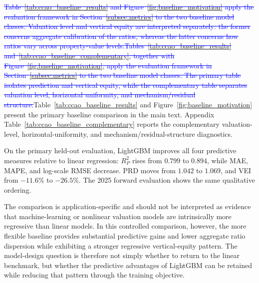 \documentclass[10pt]{article}
\theoremstyle{definition}
\newcommand{\1}{\mathbf{1}}
\newcommand{\oldtext}[1]{\textcolor{blue}{\sout{#1}}}
\newcommand{\latesttext}[1]{\textcolor{latestPurple}{#1}}
\begin{document}
\oldtext{Table~\ref{tab:ccao_baseline_results} and Figure~\ref{fig:baseline_motivation} apply the evaluation framework in Section~\ref{subsec:metrics} to the two baseline model classes. Valuation level and vertical equity are interpreted separately: the former concerns aggregate calibration of the ratios, whereas the latter concerns how ratios vary across property-value levels.}\oldtext{Tables~\ref{tab:ccao_baseline_results} and~\ref{tab:ccao_baseline_complementary}, together with Figure~\ref{fig:baseline_motivation}, apply the evaluation framework in Section~\ref{subsec:metrics} to the two baseline model classes. The primary table isolates prediction and vertical equity, while the complementary table separates valuation level, horizontal uniformity, and mechanism/residual structure.}\latesttext{Table~\ref{tab:ccao_baseline_results} and Figure~\ref{fig:baseline_motivation} present the primary baseline comparison in the main text. Appendix Table~\ref{tab:ccao_baseline_complementary} reports the complementary valuation-level, horizontal-uniformity, and mechanism/residual-structure diagnostics.} 

{On the primary held-out evaluation, LightGBM improves all four predictive measures relative to linear regression: $R^2_P$ rises from $0.799$ to $0.894$, while MAE, MAPE, and log-scale RMSE decrease. PRD moves from $1.042$ to $1.069$, and VEI from $-11.6\%$ to $-26.5\%$. The 2025 forward evaluation shows the same qualitative ordering.}


{The comparison is application-specific and should not be interpreted as evidence that machine-learning or nonlinear valuation models are intrinsically more regressive than linear models. In this controlled comparison, however, the more flexible baseline provides substantial predictive gains and lower aggregate ratio dispersion while exhibiting a stronger regressive vertical-equity pattern. The model-design question is therefore not simply whether to return to the linear benchmark, but whether the predictive advantages of LightGBM can be retained while reducing that pattern through the training objective.}
\end{document}
